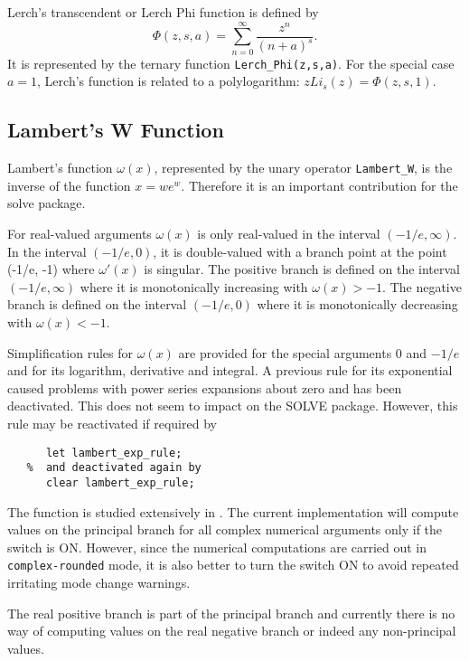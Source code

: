 Lerch's transcendent or Lerch Phi function is defined by
\[\Phi(z,s,a) = \sum_{n=0}^\infty \frac{z^n}{(n+a)^s}.\]
It is represented by the ternary function \texttt{Lerch\_Phi(z,s,a)}.
For the special case $a=1$, Lerch's function is related to a polylogarithm:
$z Li_s(z) = \Phi(z,s,1)$.

\subsection{Lambert's W Function}
\hypertarget{LAMBERTW}{}

Lambert's function $\omega(x)$, represented by the unary
operator \texttt{Lambert\_W}, is the inverse of the function
$x=we^w$. Therefore it is an important contribution for the solve
package.

For real-valued arguments $\omega(x)$ is only real-valued in the
interval $(-1/e, \infty)$.  In the interval $(-1/e, 0)$, it is double-valued
with a branch point at the point (-1/e, -1) where $\omega'(x)$ is singular.
The positive branch is defined on the interval $(-1/e, \infty)$ where it is
monotonically increasing with $\omega(x) > -1$. The negative branch is defined
on the interval $(-1/e, 0)$ where it is monotonically decreasing with
$\omega(x) < -1$.

Simplification rules for $\omega(x)$ are provided for the special arguments
$0$ and $-1/e$ and for its logarithm, derivative and integral.
A previous rule for its exponential caused problems with power series expansions
about zero and has been deactivated. This does not seem to impact on the SOLVE
package. However, this rule may be reactivated if required by
\begin{verbatim}
      let lambert_exp_rule;
   %  and deactivated again by
      clear lambert_exp_rule;
\end{verbatim}

The function is studied extensively in \cite{HareCorless:92}.
The current implementation will compute values on the principal branch for
all complex numerical arguments  only if the switch  is ON.
However, since the numerical computations are carried out in
\texttt{complex-rounded} mode, it is also better to turn the switch
 ON to avoid repeated irritating mode change warnings.

The real positive branch is part of the principal branch and currently there
is no way of computing values on the real negative  branch or indeed any
non-principal values.


